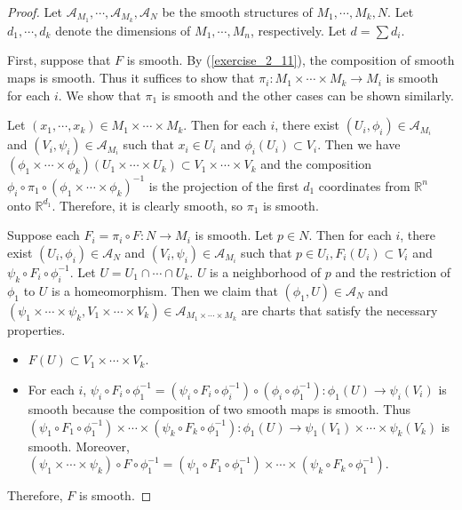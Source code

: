\begin{proof}
  Let $\mathcal{A}_{M_1}, \cdots, \mathcal{A}_{M_k}, \mathcal{A}_N$ be the smooth structures of $M_1, \cdots, M_k, N$.
  Let $d_1, \cdots, d_k$ denote the dimensions of $M_1, \cdots, M_n$, respectively.
  Let $d = \sum d_i$.

  First, suppose that $F$ is smooth.
  By (\ref{exercise_2_11}), the composition of smooth maps is smooth.
  Thus it suffices to show that $\pi_i: M_1 \times \cdots \times M_k \rightarrow M_i$ is smooth for each $i$.
  We show that $\pi_1$ is smooth and the other cases can be shown similarly.

  Let $(x_1, \cdots, x_k) \in M_1 \times \cdots \times M_k$.
  Then for each $i$, there exist $(U_i, \phi_i) \in \mathcal{A}_{M_i}$ and $(V_i, \psi_i) \in \mathcal{A}_{M_i}$ such that $x_i \in U_i$ and $\phi_i(U_i) \subset V_i$.
  Then we have $(\phi_1 \times \cdots \times \phi_k)(U_1 \times \cdots \times U_k) \subset V_1 \times \cdots \times V_k$ and the composition $\phi_i \circ \pi_1 \circ (\phi_1 \times \cdots \times \phi_k)^{-1}$ is the projection of the first $d_1$ coordinates from $\mathbb{R}^n$ onto $\mathbb{R}^{d_1}$.
  Therefore, it is clearly smooth, so $\pi_1$ is smooth.

  Suppose each $F_i = \pi_i \circ F: N \rightarrow M_i$ is smooth.
  Let $p \in N$.
  Then for each $i$, there exist $(U_i, \phi_i) \in \mathcal{A}_N$ and $(V_i, \psi_i) \in \mathcal{A}_{M_i}$ such that $p \in U_i, F_i(U_i) \subset V_i$ and $\psi_k \circ F_i \circ \phi_i^{-1}$.
  Let $U = U_1 \cap \cdots \cap U_k$.
  $U$ is a neighborhood of $p$ and the restriction of $\phi_1$ to $U$ is a homeomorphism.
  Then we claim that $(\phi_1, U) \in \mathcal{A}_N$ and $(\psi_1 \times \cdots \times \psi_k, V_1 \times \cdots \times V_k) \in \mathcal{A}_{M_1 \times \cdots \times M_k}$ are charts that satisfy the necessary properties.
  \begin{itemize}
    \item
      $F(U) \subset V_1 \times \cdots \times V_k$.
    \item
      For each $i$, $\psi_i \circ F_i \circ \phi_1^{-1} = (\psi_i \circ F_i \circ \phi_i^{-1}) \circ (\phi_i \circ \phi_1^{-1}): \phi_1(U) \rightarrow \psi_i(V_i)$ is smooth because the composition of two smooth maps is smooth.
      Thus $(\psi_1 \circ F_1 \circ \phi_1^{-1}) \times \cdots \times (\psi_k \circ F_k \circ \phi_1^{-1}): \phi_1(U) \rightarrow \psi_1(V_1) \times \cdots \times \psi_k(V_k)$ is smooth.
      Moreover, $(\psi_1 \times \cdots \times \psi_k) \circ F \circ \phi_1^{-1} = (\psi_1 \circ F_1 \circ \phi_1^{-1}) \times \cdots \times (\psi_k \circ F_k \circ \phi_1^{-1})$.
  \end{itemize}

  Therefore, $F$ is smooth.
\end{proof}

